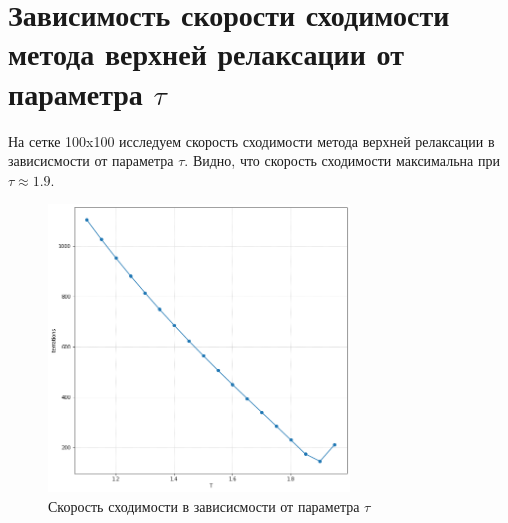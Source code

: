 \documentclass[20pt]{article}
\begin{document}
\section{Зависимость скорости сходимости метода верхней релаксации от параметра $\tau$}
    На сетке 100x100 исследуем скорость сходимости метода верхней релаксации в зависисмости от параметра $\tau$. Видно, что скорость сходимости максимальна при $\tau \approx 1.9$.
    \begin{figure}[h!]
        \centering
        \includegraphics[width=80mm]{tau.png}
        \caption{Скорость сходимости в зависисмости от параметра $\tau$}
        \label{setup}
    \end{figure}
    
 
\end{document}
